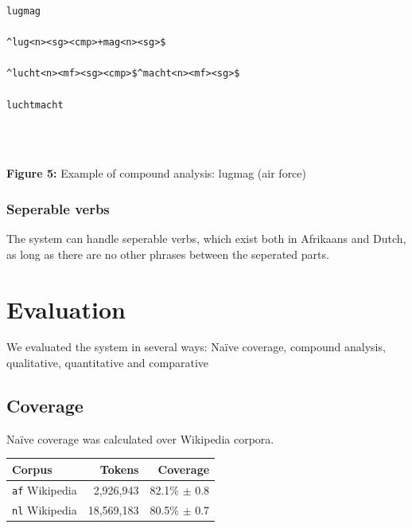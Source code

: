 \documentclass[a0,landscape]{a0poster}
\begin{document}
\begin{multicols}{4}
\begin{center}
\begin{minipage}[b]{26cm}
\begin{small}
\begin{verbatim}
lugmag

^lug<n><sg><cmp>+mag<n><sg>$

^lucht<n><mf><sg><cmp>$^macht<n><mf><sg>$

luchtmacht
\end{verbatim}
\end{small}
\end{minipage}\\
\end{center}
~\\
\textbf{Figure 5:} Example of compound analysis: lugmag (air force)



\subsubsection{Seperable verbs}

\noindent
The system can handle seperable verbs, which exist both in Afrikaans and Dutch, as
long as there are no other phrases between the seperated parts.\\

\section{Evaluation}
\noindent
We evaluated the system in several ways: Naïve coverage, compound analysis, qualitative, quantitative and comparative

\subsection{Coverage}

\noindent
Naïve coverage was calculated over Wikipedia corpora.\\


\begin{minipage}[b]{25cm}
\begin{center}
  \begin{tabular}{|l|r|r|}
   \hline
   {\bf Corpus}           & {\bf Tokens}    & {\bf Coverage}\\
   \hline
   {\tt af} Wikipedia     & 2,926,943       & 82.1\% $\pm$ 0.8 \\
   \hline
   {\tt nl} Wikipedia     & 18,569,183      & 80.5\% $\pm$ 0.7 \\
   \hline
  \end{tabular}
    

\end{center}
\end{minipage}
\end{multicols}
\end{document}
